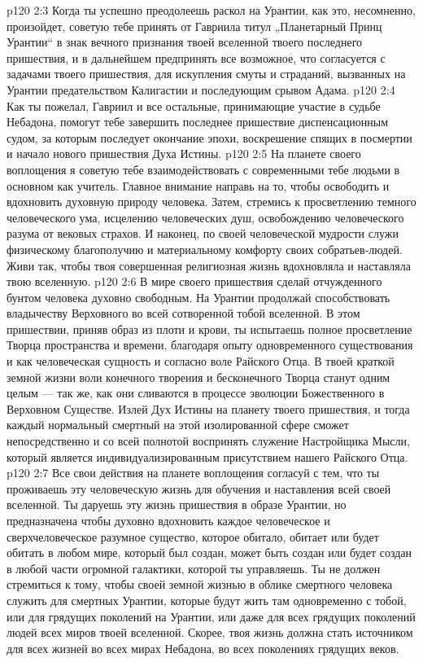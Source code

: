 \vs p120 2:3 \pc {}\bibnobreakspace Когда ты успешно преодолеешь раскол на Урантии, как это, несомненно, произойдет, советую тебе принять от Гавриила титул „Планетарный Принц Урантии“ в знак вечного признания твоей вселенной твоего последнего пришествия, и в дальнейшем предпринять все возможное, что согласуется с задачами твоего пришествия, для искупления смуты и страданий, вызванных на Урантии предательством Калигастии и последующим срывом Адама.
\vs p120 2:4 \pc {}\bibnobreakspace Как ты пожелал, Гавриил и все остальные, принимающие участие в судьбе Небадона, помогут тебе завершить последнее пришествие диспенсационным судом, за которым последует окончание эпохи, воскрешение спящих в посмертии и начало нового пришествия Духа Истины.
\vs p120 2:5 \pc {}\bibnobreakspace На планете своего воплощения я советую тебе взаимодействовать с современными тебе людьми в основном как учитель. Главное внимание направь на то, чтобы освободить и вдохновить духовную природу человека. Затем, стремись к просветлению темного человеческого ума, исцелению человеческих душ, освобождению человеческого разума от вековых страхов. И наконец, по своей человеческой мудрости служи физическому благополучию и материальному комфорту своих собратьев\hyp{}людей. Живи так, чтобы твоя совершенная религиозная жизнь вдохновляла и наставляла твою вселенную.
\vs p120 2:6 \pc {}\bibnobreakspace В мире своего пришествия сделай отчужденного бунтом человека духовно свободным. На Урантии продолжай способствовать владычеству Верховного во всей сотворенной тобой вселенной. В этом пришествии, приняв образ из плоти и крови, ты испытаешь полное просветление Творца пространства и времени, благодаря опыту одновременного существования и как человеческая сущность и согласно воле Райского Отца. В твоей краткой земной жизни воли конечного творения и бесконечного Творца станут одним целым --- так же, как они сливаются в процессе эволюции Божественного в Верховном Существе. Излей Дух Истины на планету твоего пришествия, и тогда каждый нормальный смертный на этой изолированной сфере сможет непосредственно и со всей полнотой воспринять служение Настройщика Мысли, который является индивидуализированным присутствием нашего Райского Отца.
\vs p120 2:7 \pc {}\bibnobreakspace Все свои действия на планете воплощения согласуй с тем, что ты проживаешь эту человеческую жизнь для обучения и наставления всей своей вселенной. Ты даруешь эту жизнь пришествия в образе  Урантии, но предназначена  чтобы духовно вдохновить каждое человеческое и сверхчеловеческое разумное существо, которое обитало, обитает или будет обитать в любом мире, который был создан, может быть создан или будет создан в любой части огромной галактики, которой ты управляешь. Ты не должен стремиться к тому, чтобы своей земной жизнью в облике смертного человека служить  для смертных Урантии, которые будут жить там одновременно с тобой, или для грядущих поколений на Урантии, или даже для всех грядущих поколений людей всех миров твоей вселенной. Скорее, твоя жизнь должна стать источником  для всех жизней во всех мирах Небадона, во всех поколениях грядущих веков.

